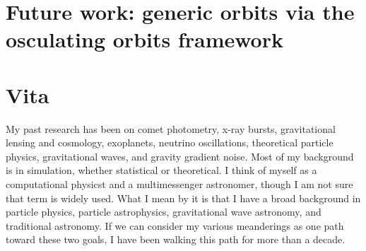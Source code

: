 \documentclass[12pt,letterpaper]{lsuetd}
\begin{document}
\chapter{Future work: generic orbits via the osculating orbits framework}
\doublespacing

\label{futurework}
\pagebreak
\singlespacing
\begin{thebibliography}{999}
\vspace{0.9em}

\end{thebibliography}
%
%

\chapter*{Vita}
\doublespacing
\setlength{\parindent}{1.75em}
\vspace{0.2em}
My past research has been on comet photometry, x-ray bursts, gravitational lensing and cosmology, exoplanets, neutrino oscillations, theoretical particle physics, gravitational waves, and gravity gradient noise. Most of my background is in simulation, whether statistical or theoretical. I think of myself as a computational physicst and a multimessenger astronomer, though I am not sure that term is widely used. What I mean by it is that I have a broad background in particle physics, particle astrophysics, gravitational wave astronomy, and traditional astronomy. If we can consider my various meanderings as one path toward these two goals, I have been walking this path for more than a decade.
\end{document}
